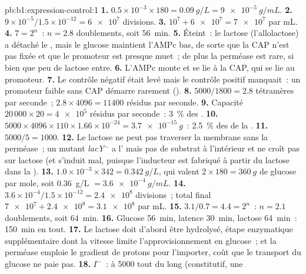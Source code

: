 \begin{solution}{pb:b1:expression-control:1}
\textbf{1.} $0.5\times 10^{-3}\times 180 = \qty{0.09}{g/L} =
\qty{9e-5}{g/mL}$.
\textbf{2.} $9\times 10^{-5}/1.5\times 10^{-12} = \num{6e7}$ divisions.
\textbf{3.} $10^7 + \num{6e7} = \num{7e7}$  par mL.
\textbf{4.} $7 = 2^n$~: $n = 2.8$ doublements, soit \qty{56}{min}.
\textbf{5.} Éteint~: le lactose (l'allolactose) a détaché le ,
mais le glucose maintient l'AMPc bas, de sorte que la CAP n'est pas
fixée et que le promoteur est presque muet~; de plus la perméase est
rare, si bien que peu de lactose entre.
\textbf{6.} L'AMPc monte et se lie à la CAP, qui se lie au promoteur.
\textbf{7.} Le contrôle négatif était levé mais le contrôle positif
manquait~: un promoteur faible sans CAP démarre rarement ().
\textbf{8.} $5000/1800 = 2.8$ tétramères par seconde~; $2.8\times 4096 =
\num{11400}$ résidus par seconde.
\textbf{9.} Capacité $20\,000\times 20 = \num{4e5}$ résidus par
seconde~: \qty{3}{\%} des .
\textbf{10.} $5000\times 4096\times 110\times 1.66\times 10^{-24} =
\qty{3.7e-15}{g}$~: \qty{2.5}{\%} des  de la .
\textbf{11.} $5000/5 = 1000$.
\textbf{12.} Le lactose ne peut pas traverser la membrane sans la
perméase~; un mutant \emph{lacY}$^-$ a l' mais pas de substrat à
l'intérieur et ne croît pas sur lactose (et s'induit mal, puisque
l'inducteur est fabriqué à partir du lactose dans la ).
\textbf{13.} $1.0\times 10^{-3}\times 342 = \qty{0.342}{g/L}$, qui
valent $2\times 180 = \qty{360}{g}$ de glucose par mole, soit
\qty{0.36}{g/L} $= \qty{3.6e-4}{g/mL}$.
\textbf{14.} $3.6\times 10^{-4}/1.5\times 10^{-12} = \num{2.4e8}$
divisions~; total final $\num{7e7} + \num{2.4e8} = \num{3.1e8}$ par mL.
\textbf{15.} $3.1/0.7 = 4.4 = 2^n$~: $n = 2.1$ doublements, soit
\qty{64}{min}.
\textbf{16.} Glucose \qty{56}{min}, latence \qty{30}{min}, lactose
\qty{64}{min}~: \qty{150}{min} en tout.
\textbf{17.} Le lactose doit d'abord être hydrolysé, étape enzymatique
supplémentaire dont la vitesse limite l'approvisionnement en glucose~;
et la perméase emploie le gradient de protons pour l'importer, coût que
le transport du glucose ne paie pas.
\textbf{18.} $I^-$~:  à \num{5000} tout du long (constitutif, une

\end{solution}
